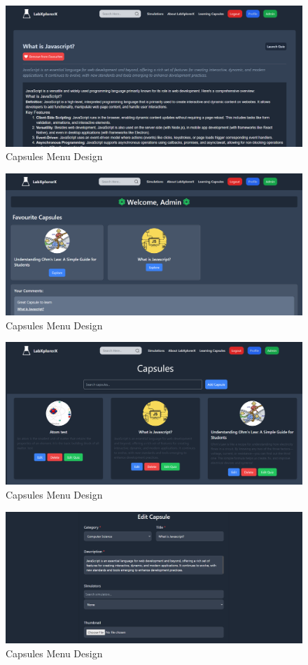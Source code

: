  \begin{figure}[H]
    \centering
     \includegraphics[width = 15cm]{Diagrams/interface/cap.png}
     \caption{Capsules Menu Design}
 \end{figure}
 \begin{figure}[H]
    \centering
     \includegraphics[width = 15cm]{Diagrams/interface/admin.png}
     \caption{Capsules Menu Design}
 \end{figure}
 \begin{figure}[H]
    \centering
     \includegraphics[width = 15cm]{Diagrams/interface/admin_dash.png}
     \caption{Capsules Menu Design}
 \end{figure}
 \begin{figure}[H]
    \centering
     \includegraphics[width = 15cm]{Diagrams/interface/edit.png}
     \caption{Capsules Menu Design}
 \end{figure}
\newpage
